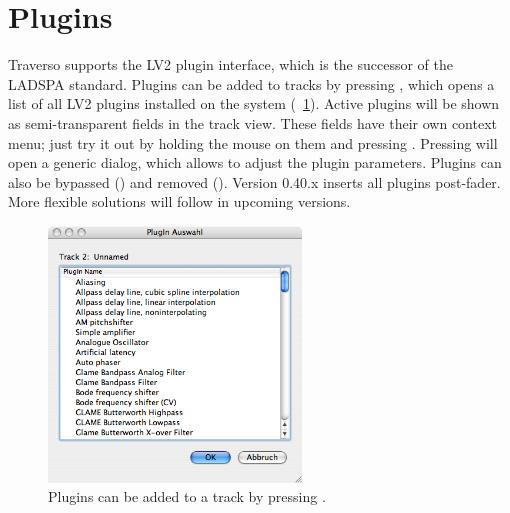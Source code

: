 \section{Plugins}
Traverso supports the LV2 plugin interface, which is the successor of the LADSPA standard. Plugins can be added to tracks by pressing , which opens a list of all LV2 plugins installed on the system (\FigB~\ref{fig_pluglist}). Active plugins will be shown as semi-transparent fields in the track view. These fields have their own context menu; just try it out by holding the mouse on them and pressing . Pressing  will open a generic dialog, which allows to adjust the plugin parameters. Plugins can also be bypassed () and removed (). Version 0.40.x inserts all plugins post-fader. More flexible solutions will follow in upcoming versions.

\begin{figure}[t]
 \centering\includegraphics[width=0.6\textwidth]{images/plugin-list}
 \caption{Plugins can be added to a track by pressing .}
 \label{fig_pluglist}
\end{figure}


